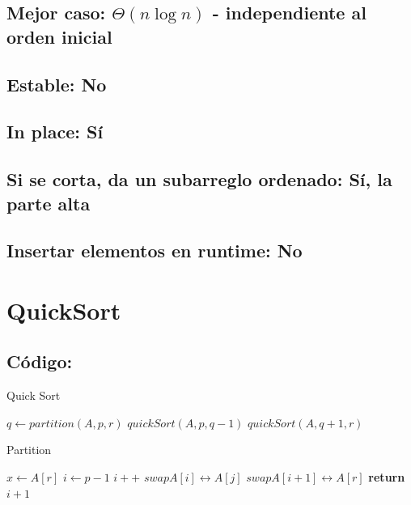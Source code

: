 \documentclass[a4paper]{article}
\begin{document}
\subsection{Mejor caso: $\Theta (n \log{} n)$ - independiente al orden inicial}
\subsection{Estable: No}
\subsection{In place: S\'i}
\subsection{Si se corta, da un subarreglo ordenado: S\'i, la parte alta}
\subsection{Insertar elementos en runtime: No}

\newpage
\section{QuickSort}

\subsection{C\'odigo:}
\begin{algorithm}
\caption{Quick Sort}\label{selection}
\begin{algorithmic}[1]
		\State $q \gets partition(A,p,r)$
		\State $quickSort(A,p,q-1)$
		\State $quickSort(A,q+1,r)$
	\EndIf
\EndProcedure
\end{algorithmic}
\end{algorithm}

\begin{algorithm}
\caption{Partition}\label{selection}
\begin{algorithmic}[1]
	\State $x \gets A[r]$
	\State $i \gets p-1$
			\State $i++$
			\State $swap A[i] \leftrightarrow A[j]$
		\EndIf
	\EndFor
	\State $swap A[i+1] \leftrightarrow A[r]$
	\State \textbf{return} $i+1$
\EndProcedure
\end{algorithmic}
\end{algorithm}
\end{document}
